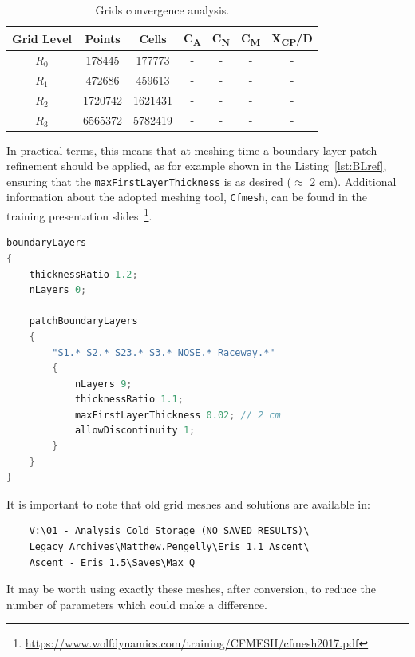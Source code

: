 \documentclass[12pt]{article}
\begin{document}
\begin{table}[H]
    \centering
    \captionsetup{skip=1pt} 
    \caption{Grids convergence analysis.}
    \begin{tabular}{ccccccc}
        \hline
        \textbf{Grid Level} & \textbf{Points} & \textbf{Cells} & \textbf{C\textsubscript{A}} & \textbf{C\textsubscript{N}} & \textbf{C\textsubscript{M}} & \textbf{X\textsubscript{CP}/D} \\
        \hline 
        $R_0$ & 178445  & 177773  & - & - & - & - \\
        $R_1$ & 472686  & 459613  & - & - & - & - \\
        $R_2$ & 1720742 & 1621431 & - & - & - & - \\
        $R_3$ & 6565372 & 5782419 & - & - & - & - \\
        \hline
    \end{tabular}
    \label{tab:grid_resolution}
\end{table}
%
\noindent In practical terms, this means that at meshing time a boundary layer patch refinement should be applied, as for example shown in the Listing~\ref{lst:BLref}, ensuring that the \texttt{maxFirstLayerThickness} is as desired ($\approx$ 2 cm). Additional information about the adopted meshing tool, \texttt{Cfmesh}, can be found in the training presentation slides~\footnote{\url{https://www.wolfdynamics.com/training/CFMESH/cfmesh2017.pdf}}.
%
\begin{lstlisting}[caption=Boundary layer refinement strategy in system/\texttt{meshDict}., label=lst:BLref, language=C++]
boundaryLayers
{
    thicknessRatio 1.2;
    nLayers 0;

    patchBoundaryLayers
    {
        "S1.* S2.* S23.* S3.* NOSE.* Raceway.*"
        {
            nLayers 9;
            thicknessRatio 1.1;
            maxFirstLayerThickness 0.02; // 2 cm
            allowDiscontinuity 1;
        }
    }
}
\end{lstlisting}

It is important to note that old grid meshes and solutions are available in:
\begin{verbatim}
    V:\01 - Analysis Cold Storage (NO SAVED RESULTS)\
    Legacy Archives\Matthew.Pengelly\Eris 1.1 Ascent\
    Ascent - Eris 1.5\Saves\Max Q
\end{verbatim}
 It may be worth using exactly these meshes, after conversion, to reduce the number of parameters which could make a difference.

\end{document}

